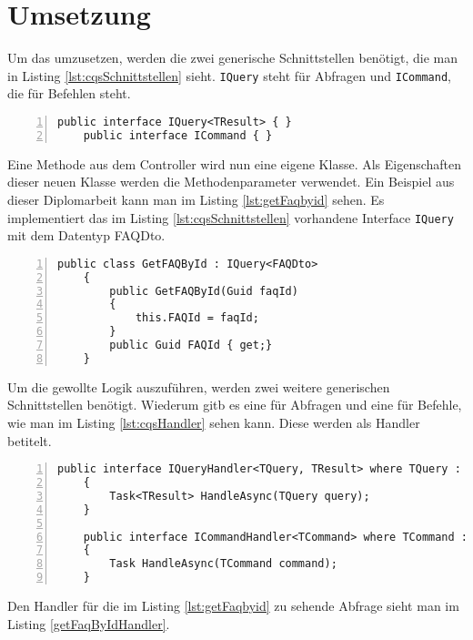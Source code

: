\section{Umsetzung}
Um das umzusetzen, werden die zwei generische Schnittstellen benötigt, die man in Listing \ref{lst:cqsSchnittstellen} sieht. \texttt{IQuery} steht für Abfragen und \texttt{ICommand}, die für Befehlen steht.
\begin{lstlisting}[caption={CQS-Schnittstellen},captionpos=b, numbers=left, backgroundcolor=\color{black!10},language={[Sharp]C}, label={lst:cqsSchnittstellen}]
	public interface IQuery<TResult> { }
	public interface ICommand { }
\end{lstlisting}
Eine Methode aus dem Controller wird nun eine eigene Klasse. Als Eigenschaften dieser neuen Klasse werden die Methodenparameter verwendet. Ein Beispiel aus dieser Diplomarbeit kann man im Listing \ref{lst:getFaqbyid} sehen. Es implementiert das im Listing \ref{lst:cqsSchnittstellen} vorhandene Interface \texttt{IQuery} mit dem Datentyp FAQDto.
\begin{lstlisting}[caption={CQS-Query Beispiel},captionpos=b, numbers=left, backgroundcolor=\color{black!10},language={[Sharp]C}, label={lst:getFaqbyid}]
	public class GetFAQById : IQuery<FAQDto>
	{
		public GetFAQById(Guid faqId)
		{
			this.FAQId = faqId;
		}
		public Guid FAQId { get;}
	}
\end{lstlisting}
Um die gewollte Logik auszuführen, werden zwei weitere generischen Schnittstellen benötigt. Wiederum gitb es eine für Abfragen und eine für Befehle, wie man im Listing \ref{lst:cqsHandler} sehen kann. Diese werden als Handler betitelt. \autocite{cqsSOLIDeArchitektur}
\begin{lstlisting}[caption={CQS-Handler},captionpos=b, numbers=left, backgroundcolor=\color{black!10},language={[Sharp]C}, label={lst:cqsHandler}]
	public interface IQueryHandler<TQuery, TResult>	where TQuery : IQuery<TResult>
	{
		Task<TResult> HandleAsync(TQuery query);
	}
	
	public interface ICommandHandler<TCommand> where TCommand : ICommand
	{
		Task HandleAsync(TCommand command);
	}
\end{lstlisting}
Den Handler für die im Listing \ref{lst:getFaqbyid} zu sehende Abfrage sieht man im Listing \ref{getFaqByIdHandler}.
